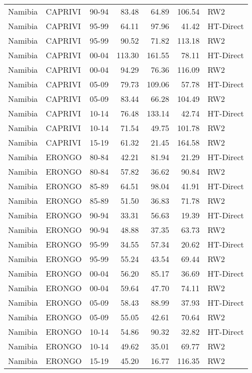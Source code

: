 \begin{longtable}{lllrrrl}
  Namibia & CAPRIVI & 90-94 & 83.48 & 64.89 & 106.54 & RW2 \\ 
  Namibia & CAPRIVI & 95-99 & 64.11 & 97.96 & 41.42 & HT-Direct \\ 
  Namibia & CAPRIVI & 95-99 & 90.52 & 71.82 & 113.18 & RW2 \\ 
  Namibia & CAPRIVI & 00-04 & 113.30 & 161.55 & 78.11 & HT-Direct \\ 
  Namibia & CAPRIVI & 00-04 & 94.29 & 76.36 & 116.09 & RW2 \\ 
  Namibia & CAPRIVI & 05-09 & 79.73 & 109.06 & 57.78 & HT-Direct \\ 
  Namibia & CAPRIVI & 05-09 & 83.44 & 66.28 & 104.49 & RW2 \\ 
  Namibia & CAPRIVI & 10-14 & 76.48 & 133.14 & 42.74 & HT-Direct \\ 
  Namibia & CAPRIVI & 10-14 & 71.54 & 49.75 & 101.78 & RW2 \\ 
  Namibia & CAPRIVI & 15-19 & 61.32 & 21.45 & 164.58 & RW2 \\ 
  Namibia & ERONGO & 80-84 & 42.21 & 81.94 & 21.29 & HT-Direct \\ 
  Namibia & ERONGO & 80-84 & 57.82 & 36.62 & 90.84 & RW2 \\ 
  Namibia & ERONGO & 85-89 & 64.51 & 98.04 & 41.91 & HT-Direct \\ 
  Namibia & ERONGO & 85-89 & 51.50 & 36.83 & 71.78 & RW2 \\ 
  Namibia & ERONGO & 90-94 & 33.31 & 56.63 & 19.39 & HT-Direct \\ 
  Namibia & ERONGO & 90-94 & 48.88 & 37.35 & 63.73 & RW2 \\ 
  Namibia & ERONGO & 95-99 & 34.55 & 57.34 & 20.62 & HT-Direct \\ 
  Namibia & ERONGO & 95-99 & 55.24 & 43.54 & 69.44 & RW2 \\ 
  Namibia & ERONGO & 00-04 & 56.20 & 85.17 & 36.69 & HT-Direct \\ 
  Namibia & ERONGO & 00-04 & 59.64 & 47.70 & 74.11 & RW2 \\ 
  Namibia & ERONGO & 05-09 & 58.43 & 88.99 & 37.93 & HT-Direct \\ 
  Namibia & ERONGO & 05-09 & 55.05 & 42.61 & 70.64 & RW2 \\ 
  Namibia & ERONGO & 10-14 & 54.86 & 90.32 & 32.82 & HT-Direct \\ 
  Namibia & ERONGO & 10-14 & 49.62 & 35.01 & 69.77 & RW2 \\ 
  Namibia & ERONGO & 15-19 & 45.20 & 16.77 & 116.35 & RW2 \\ 

\end{longtable}
